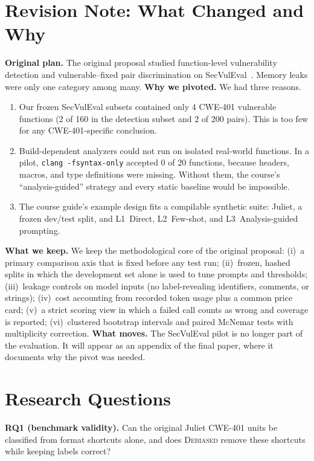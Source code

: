 \documentclass[conference]{IEEEtran}
\newcommand{\Deb}{\textsc{Debiased}}
\newcommand{\code}[1]{\texttt{#1}}
\newcommand{\cwe}{CWE-401}
\begin{document}
\section{Revision Note: What Changed and Why}
\label{sec:revision}
\textbf{Original plan.}
The original proposal studied function-level vulnerability detection and vulnerable--fixed pair discrimination on SecVulEval~\cite{ahmed2026secvuleval}.
Memory leaks were only one category among many.
\textbf{Why we pivoted.}
We had three reasons.
\begin{enumerate}
\item Our frozen SecVulEval subsets contained only 4 \cwe{} vulnerable functions (2 of 160 in the detection subset and 2 of 200 pairs). %
This is too few for any \cwe{}-specific conclusion.
\item Build-dependent analyzers could not run on isolated real-world functions. In a pilot, \code{clang -fsyntax-only} accepted 0 of 20 functions, because headers, macros, and type definitions were missing. %
Without them, the course's ``analysis-guided'' strategy and every static baseline would be impossible.
\item The course guide's example design fits a compilable synthetic suite: Juliet, a frozen dev/test split, and L1~Direct, L2~Few-shot, and L3~Analysis-guided prompting.
\end{enumerate}
\textbf{What we keep.}
We keep the methodological core of the original proposal:
(i)~a primary comparison axis that is fixed before any test run;
(ii)~frozen, hashed splits in which the development set alone is used to tune prompts and thresholds;
(iii)~leakage controls on model inputs (no label-revealing identifiers, comments, or strings);
(iv)~cost accounting from recorded token usage plus a common price card;
(v)~a strict scoring view in which a failed call counts as wrong and coverage is reported;
(vi)~clustered bootstrap intervals and paired McNemar tests with multiplicity correction.
\textbf{What moves.}
The SecVulEval pilot is no longer part of the evaluation. It will appear as an appendix of the final paper, where it documents why the pivot was needed.

\section{Research Questions}
\label{sec:rq}
\noindent\textbf{RQ1 (benchmark validity).} Can the original Juliet \cwe{} units be classified from format shortcuts alone, and does \Deb{} remove these shortcuts while keeping labels correct?
\end{document}
